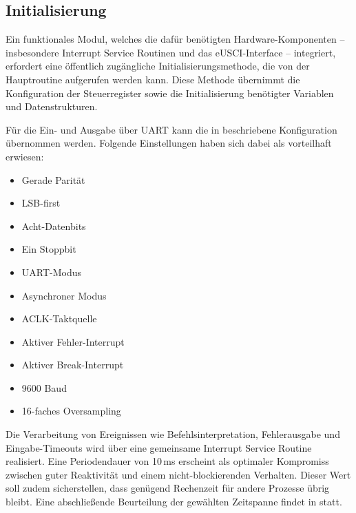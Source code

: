 
\newpage
\subsection{Initialisierung}
\label{sec:Init}

Ein funktionales Modul, welches die daf\"ur ben\"otigten Hardware-Komponenten -- insbesondere Interrupt Service Routinen und das eUSCI-Interface -- integriert, erfordert eine \"offentlich zug\"angliche Initialisierungsmethode, die von der Hauptroutine aufgerufen werden kann. Diese Methode \"ubernimmt die Konfiguration der Steuerregister sowie die Initialisierung ben\"otigter Variablen und Datenstrukturen.

F\"ur die Ein- und Ausgabe \"uber UART kann die in  beschriebene Konfiguration \"ubernommen werden. Folgende Einstellungen haben sich dabei als vorteilhaft erwiesen:

\begin{multicols}{2}
	\begin{itemize}
		\item Gerade Parit\"at
		\item LSB-first
		\item Acht-Datenbits
		\item Ein Stoppbit
		\item UART-Modus
		\item Asynchroner Modus
	\end{itemize}	
\vfill\null
\columnbreak
	\begin{itemize}
		\item ACLK-Taktquelle
		\item Aktiver Fehler-Interrupt
		\item Aktiver Break-Interrupt
		\item 9600 Baud
		\item 16-faches Oversampling
	\end{itemize}
\vfill\null
\end{multicols}

Die Verarbeitung von Ereignissen wie Befehlsinterpretation, Fehlerausgabe und Eingabe-Timeouts wird \"uber eine gemeinsame Interrupt Service Routine realisiert. Eine Periodendauer von 10\,ms erscheint als optimaler Kompromiss zwischen guter Reaktivit\"at und einem nicht-blockierenden Verhalten. Dieser Wert soll zudem sicherstellen, dass gen\"ugend Rechenzeit f\"ur andere Prozesse \"ubrig bleibt. Eine abschlie{\ss}ende Beurteilung der gew\"ahlten Zeitspanne findet in  statt. 

